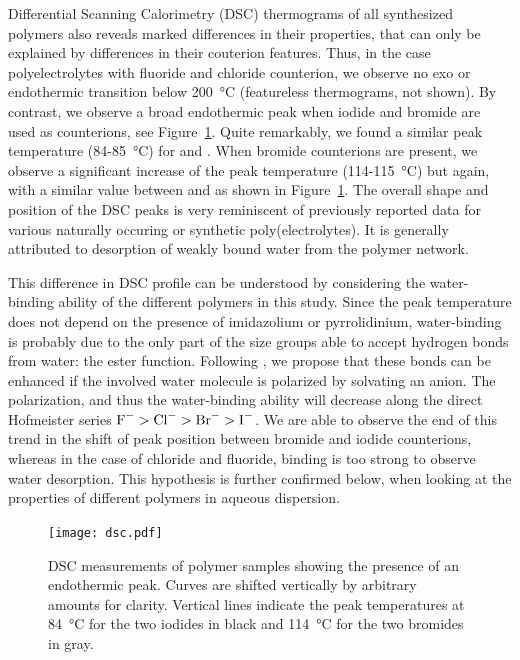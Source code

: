 \documentclass[journal=jacsat,manuscript=article]{achemso}
\begin{document}
Differential Scanning Calorimetry (DSC) thermograms  of all synthesized polymers also reveals marked differences in their properties, that can only be explained by differences in their couterion features. Thus, in the case polyelectrolytes with fluoride and chloride counterion, we observe no exo or endothermic transition below \SI{200}{\celsius} (featureless thermograms, not shown). By contrast, we observe a broad endothermic peak when iodide and bromide are used as counterions, see Figure~\ref{fig:dsc}. Quite remarkably, we found a similar peak temperature (84-\SI{85}{\celsius}) for  and . When bromide counterions are present, we observe a significant increase of the peak temperature (114-\SI{115}{\celsius}) but again, with a similar value between  and  as shown in Figure~\ref{fig:dsc}. The overall shape and position of the DSC peaks is very reminiscent of previously reported data for various naturally occuring or synthetic poly(electrolytes)\cite{Li2005,Sarmento2006,Ostrowska-Czubenko2009a,Moin2015}. It is generally attributed to desorption of weakly bound water from the polymer network. %

This difference in DSC profile can be understood by considering the water-binding ability of the different polymers in this study. Since the peak temperature does not depend on the presence of imidazolium or pyrrolidinium, water-binding is probably due to the only part of the size groups able to accept hydrogen bonds from water: the ester function. Following \citet{Zhang2010a}, we propose that these bonds can be enhanced if the involved water molecule is polarized by solvating an anion. The polarization, and thus the water-binding ability will decrease along the direct Hofmeister series $\ce{F-}>\ce{Cl-}>\ce{Br-}>\ce{I-}$. We are able to observe the end of this trend in the shift of peak position between bromide and iodide counterions, whereas in the case of chloride and fluoride, binding is too strong to observe water desorption. This hypothesis is further confirmed below, when looking at the properties of different polymers in aqueous dispersion.

\begin{figure}
\texttt{[image: dsc.pdf]}
\caption{DSC measurements of polymer samples showing the presence of an endothermic peak. Curves are shifted vertically by arbitrary amounts for clarity. Vertical lines indicate the peak temperatures at \SI{84}{\celsius} for the two iodides in black and \SI{114}{\celsius} for the two bromides in gray.}
\label{fig:dsc}
\end{figure}
\end{document}
